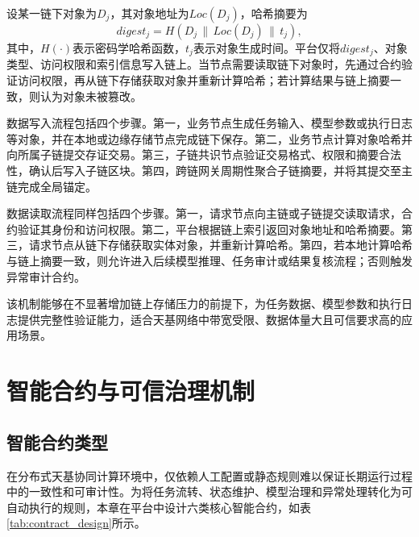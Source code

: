 设某一链下对象为\(D_j\)，其对象地址为\(Loc(D_j)\)，哈希摘要为
\begin{equation}
  digest_j=H(D_j\,\|\,Loc(D_j)\,\|\,t_j),
  \label{eq:data_digest}
\end{equation}
其中，\(H(\cdot)\)表示密码学哈希函数，\(t_j\)表示对象生成时间。平台仅将\(digest_j\)、对象类型、访问权限和索引信息写入链上。当节点需要读取链下对象时，先通过合约验证访问权限，再从链下存储获取对象并重新计算哈希；若计算结果与链上摘要一致，则认为对象未被篡改。

数据写入流程包括四个步骤。第一，业务节点生成任务输入、模型参数或执行日志等对象，并在本地或边缘存储节点完成链下保存。第二，业务节点计算对象哈希并向所属子链提交存证交易。第三，子链共识节点验证交易格式、权限和摘要合法性，确认后写入子链区块。第四，跨链网关周期性聚合子链摘要，并将其提交至主链完成全局锚定。

数据读取流程同样包括四个步骤。第一，请求节点向主链或子链提交读取请求，合约验证其身份和访问权限。第二，平台根据链上索引返回对象地址和哈希摘要。第三，请求节点从链下存储获取实体对象，并重新计算哈希。第四，若本地计算哈希与链上摘要一致，则允许进入后续模型推理、任务审计或结果复核流程；否则触发异常审计合约。

该机制能够在不显著增加链上存储压力的前提下，为任务数据、模型参数和执行日志提供完整性验证能力，适合天基网络中带宽受限、数据体量大且可信要求高的应用场景。

\section{智能合约与可信治理机制}
\label{sec:contract_governance}

\subsection{智能合约类型}

在分布式天基协同计算环境中，仅依赖人工配置或静态规则难以保证长期运行过程中的一致性和可审计性。为将任务流转、状态维护、模型治理和异常处理转化为可自动执行的规则，本章在平台中设计六类核心智能合约，如表\ref{tab:contract_design}所示。

